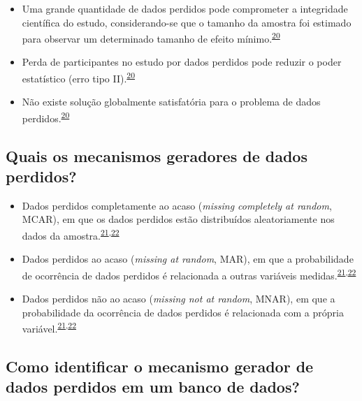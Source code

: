 \documentclass[
]{book}
\begin{document}
\begin{itemize}
\item
  Uma grande quantidade de dados perdidos pode comprometer a integridade científica do estudo, considerando-se que o tamanho da amostra foi estimado para observar um determinado tamanho de efeito mínimo.\textsuperscript{\protect\hyperlink{ref-Altman2007}{20}}
\item
  Perda de participantes no estudo por dados perdidos pode reduzir o poder estatístico (erro tipo II).\textsuperscript{\protect\hyperlink{ref-Altman2007}{20}}
\item
  Não existe solução globalmente satisfatória para o problema de dados perdidos.\textsuperscript{\protect\hyperlink{ref-Altman2007}{20}}
\end{itemize}

\hypertarget{quais-os-mecanismos-geradores-de-dados-perdidos}{%
\subsection{Quais os mecanismos geradores de dados perdidos?}\label{quais-os-mecanismos-geradores-de-dados-perdidos}}

\begin{itemize}
\item
  Dados perdidos completamente ao acaso (\emph{missing completely at random}, MCAR), em que os dados perdidos estão distribuídos aleatoriamente nos dados da amostra.\textsuperscript{\protect\hyperlink{ref-Heymans2022}{21},\protect\hyperlink{ref-carpenter2021}{22}}
\item
  Dados perdidos ao acaso (\emph{missing at random}, MAR), em que a probabilidade de ocorrência de dados perdidos é relacionada a outras variáveis medidas.\textsuperscript{\protect\hyperlink{ref-Heymans2022}{21},\protect\hyperlink{ref-carpenter2021}{22}}
\item
  Dados perdidos não ao acaso (\emph{missing not at random}, MNAR), em que a probabilidade da ocorrência de dados perdidos é relacionada com a própria variável.\textsuperscript{\protect\hyperlink{ref-Heymans2022}{21},\protect\hyperlink{ref-carpenter2021}{22}}
\end{itemize}

\hypertarget{como-identificar-o-mecanismo-gerador-de-dados-perdidos-em-um-banco-de-dados}{%
\subsection{Como identificar o mecanismo gerador de dados perdidos em um banco de dados?}\label{como-identificar-o-mecanismo-gerador-de-dados-perdidos-em-um-banco-de-dados}}
\end{document}

